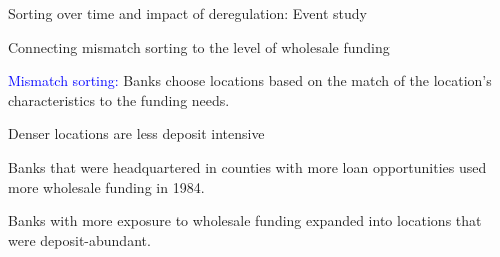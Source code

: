 \documentclass[notes,10pt, aspectratio=169]{beamer}
\newenvironment{wideitemize}{\itemize\addtolength{\itemsep}{10pt}}{\enditemize}
\begin{document}
\begin{frame}{Sorting over time and impact of deregulation: Event study}
    \end{frame}



    \begin{frame}{Connecting mismatch sorting to the level of wholesale funding}\label{mismatch_sorting}

        \vspace{0.1cm}

        \textcolor{blue}{Mismatch sorting:} Banks choose locations based on the match of the location's characteristics to the funding needs.
        \begin{wideitemize}
            \item Denser locations are less deposit intensive \hyperlink{mismatch_sorting1}{}
            
            \item Banks that were headquartered in counties with more loan opportunities used more wholesale funding in 1984. 
            \hyperlink{mismatch_sorting2}{}
            
            \item Banks with more exposure to wholesale funding expanded into locations that were deposit-abundant.
            \hyperlink{mismatch_sorting3}{}

        \end{wideitemize}
            
        
        \end{frame}
\end{document}
